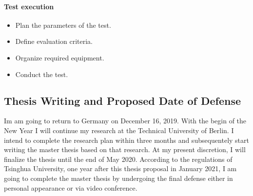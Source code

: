 \paragraph{Test execution}
\begin{itemize}
    \item Plan the parameters of the test.
    \item Define evaluation criteria.
    \item Organize required equipment.
    \item Conduct the test.
\end{itemize}



\subsection{Thesis Writing and Proposed Date of Defense}

Im am going to return to Germany on December 16, 2019.
With the begin of the New Year I will continue my research at the Technical University of Berlin.
I intend to complete the research plan within three months
and subsequentely start writing the master thesis based on that research.
At my present discretion, I will finalize the thesis until the end of May 2020.
According to the regulations of Tsinghua University,
one year after this thesis proposal in January 2021, I am going to complete the master thesis
by undergoing the final defense either in personal appearance or via video conference.


